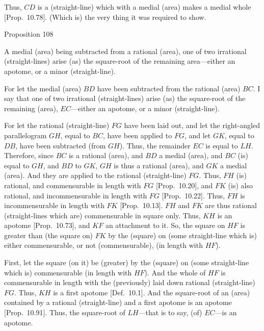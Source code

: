 Thus, $CD$ is a (straight-line) which with a medial (area) makes a medial
whole [Prop.~10.78]. (Which is) the very thing
it was required to show.


\begin{center}
{\large Proposition 108}
\end{center}

A
medial (area) being subtracted from a rational (area), one of two irrational (straight-lines)
arise (as) the square-root of the remaining area---either an apotome, or a minor (straight-line).

\epsfysize=1.5in
\centerline{}

For let the medial (area) $BD$ have been subtracted from the
rational (area) $BC$. I say that  one of two irrational (straight-lines) arise
(as) the square-root of the
remaining (area), $EC$---either
an apotome, or a minor (straight-line).

For let the rational (straight-line) $FG$ have been laid out,
and let the right-angled parallelogram $GH$, equal to $BC$, have
been applied to $FG$, and let $GK$, equal to $DB$, have
been subtracted (from $GH$).  Thus, the remainder $EC$
is equal to $LH$. Therefore, since $BC$
is a rational (area), and $BD$ a medial (area), and $BC$
(is) equal to $GH$, and $BD$ to $GK$, $GH$ is thus a rational (area),
and $GK$ a medial (area). And they are applied to the rational (straight-line)
$FG$. Thus, $FH$ (is) rational, and commensurable in length with $FG$
[Prop.~10.20], and $FK$ (is) also rational, and
incommensurable in length with $FG$ [Prop.~10.22]. Thus, $FH$ is incommensurable
in length with $FK$ [Prop.~10.13]. 
$FH$ and $FK$ are thus rational (straight-lines which are) commensurable
in square only. Thus, $KH$ is an apotome [Prop.~10.73], and $KF$ an attachment to it.
So, the square on $HF$ is  greater than (the square on) $FK$ by
the (square) on (some straight-line which is) either commensurable,
or not (commensurable), (in length with $HF$).

First, let the square (on it) be (greater) by the (square) on  (some straight-line
which is) commensurable
(in length with $HF$). And the whole of $HF$ is commensurable
in length with the (previously) laid down rational (straight-line) $FG$. 
Thus, $KH$ is a first apotome [Def.~10.1]. And
the square-root of an (area) contained by a rational (straight-line)
and a first apotome is an apotome [Prop.~10.91]. 
Thus, the square-root of $LH$---that is to say, (of) $EC$---is an apotome.

